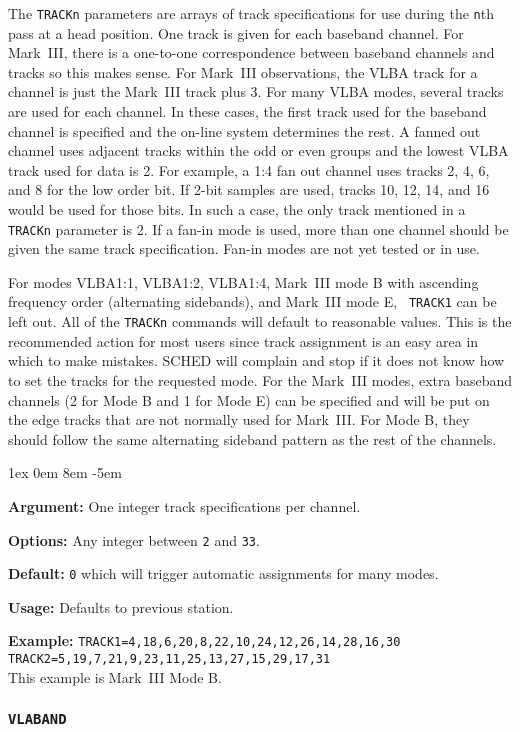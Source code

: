 \documentclass{report}
\newcommand{\rcwbox}[5]{
  \begin{list}{}{\parsep 1ex  \itemsep 0em
                 \leftmargin 8em  \itemindent -5em }
    \item {\bf Argument:} #1
    \item {\bf Options:}  #2
    \item {\bf Default:}  #3
    \item {\bf Usage:}    #4
    \item {\bf Example:}  #5
  \end{list}
}
\begin{document}
   The {\tt TRACKn} parameters are arrays of track specifications for
use during the {\tt n}th pass at a head position. One track is given
for each baseband channel. For Mark~III, there is a one-to-one
correspondence between baseband channels and tracks so this makes
sense.  For Mark~III observations, the VLBA track for a channel is
just the Mark~III track plus 3.  For many VLBA modes, several tracks
are used for each channel. In these cases, the first track used for
the baseband channel is specified and the on-line system determines
the rest. A fanned out channel uses adjacent tracks within the odd or
even groups and the lowest VLBA track used for data is 2. For example,
a 1:4 fan out channel uses tracks 2, 4, 6, and 8 for the low order
bit. If 2-bit samples are used, tracks 10, 12, 14, and 16 would be
used for those bits.  In such a case, the only track mentioned in a
{\tt TRACKn} parameter is 2.  If a fan-in mode is used, more than one
channel should be given the same track specification.  Fan-in modes
are not yet tested or in use.

For modes VLBA1:1, VLBA1:2, VLBA1:4, Mark~III mode B with ascending
frequency order (alternating sidebands), and Mark~III mode E, {\tt
TRACK1} can be left out. All of the {\tt TRACKn} commands will default
to reasonable values. This is the recommended action for most users
since track assignment is an easy area in which to make mistakes. {\sc
SCHED} will complain and stop if it does not know how to set the
tracks for the requested mode. For the Mark~III modes, extra baseband
channels (2 for Mode B and 1 for Mode E) can be specified and will be
put on the edge tracks that are not normally used for Mark~III. For
Mode B, they should follow the same alternating sideband pattern as
the rest of the channels.

\rcwbox
{One integer track specifications per channel.}
{Any integer between {\tt 2} and {\tt 33}.}
{{\tt 0} which will trigger automatic assignments for many modes.}
{Defaults to previous station.}
{{\tt TRACK1=4,18,6,20,8,22,10,24,12,26,14,28,16,30} \\
 {\tt TRACK2=5,19,7,21,9,23,11,25,13,27,15,29,17,31} \\
This example is Mark~III Mode B.}




\subsubsection{\label{SP:VLABAND}{\tt VLABAND}}
\end{document}
